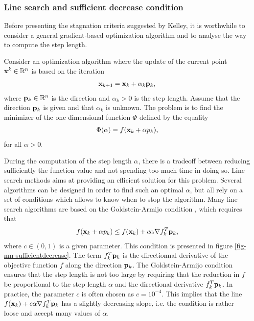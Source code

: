 \subsubsection{Line search and sufficient decrease condition}

Before presenting the stagnation criteria suggested by Kelley, it 
is worthwhile to consider a general gradient-based optimization
algorithm and to analyse the way to compute the step length.

Consider an optimization algorithm where the update of the current point $\mathbf{x}^k\in\mathbb{R}^n$
is based on the iteration 
\begin{eqnarray}
\mathbf{x}_{k+1} = \mathbf{x}_k + \alpha_k \mathbf{p}_k,
\end{eqnarray}
where $\mathbf{p}_k\in\mathbb{R}^n$ is the direction and $\alpha_k>0$ is the step 
length. Assume that the direction $\mathbf{p}_k$ is given and that $\alpha_k$ is 
unknown. The problem is to find the minimizer of the one dimensional function 
$\Phi$ defined by the equality 
\begin{eqnarray}
\Phi(\alpha) = f ( \mathbf{x}_k + \alpha p_k),
\end{eqnarray}
for all $\alpha>0$.

During the computation of the step length $\alpha$, there is a tradeoff 
between reducing sufficiently the function value and not spending 
too much time in doing so. Line search methods aims at providing an efficient 
solution for this problem. Several algorithms can be designed in order 
to find such an optimal $\alpha$, but all rely on a set of conditions 
which allows to know when to stop the algorithm. Many line search 
algorithms are based on the Goldstein-Armijo condition \cite{numericaloptimization,Gill81MurrayWright}, 
which requires that 
\begin{eqnarray}
f ( \mathbf{x}_k + \alpha p_k) \leq f(\mathbf{x}_k) + c \alpha \nabla f_k^T \mathbf{p}_k,
\end{eqnarray}
where $c\in(0,1)$ is a given parameter. This condition is presented in
figure \ref{fig-nm-sufficientdecrease}. The term $f_k^T \mathbf{p}_k$ is the 
directionnal derivative of the objective function $f$ along the direction
$\mathbf{p}_k$. The Goldstein-Armijo condition ensures that the step length is not 
too large by requiring that the reduction in $f$ be proportional 
to the step length $\alpha$ and the directional derivative $f_k^T \mathbf{p}_k$.
In practice, the parameter $c$ is often chosen as $c=10^{-4}$. 
This implies that the line $f(\mathbf{x}_k) + c \alpha \nabla f_k^T \mathbf{p}_k$ has 
a slightly decreasing slope, i.e. the condition is rather loose and 
accept many values of $\alpha$.

